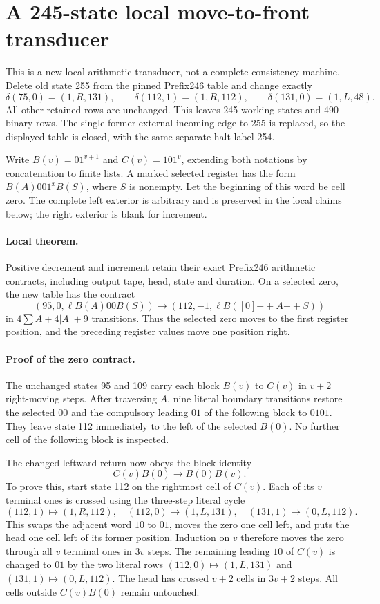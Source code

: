 \section{A 245-state local move-to-front transducer}

This is a new local arithmetic transducer, not a complete consistency machine.
Delete old state 255 from the pinned Prefix246 table and change exactly
\[
\delta(75,0)=(1,R,131),\qquad
\delta(112,1)=(1,R,112),\qquad
\delta(131,0)=(1,L,48).
\]
All other retained rows are unchanged. This leaves 245 working states and
490 binary rows. The single former external incoming edge to 255 is replaced,
so the displayed table is closed, with the same separate halt label 254.

Write $B(v)=01^{v+1}$ and $C(v)=101^v$, extending both notations by
concatenation to finite lists. A marked selected register has the form
$B(A)00 1^x B(S)$, where $S$ is nonempty. Let the beginning of this word be
cell zero. The complete left exterior is arbitrary and is preserved in the
local claims below; the right exterior is blank for increment.

\paragraph{Local theorem.}
Positive decrement and increment retain their exact Prefix246 arithmetic
contracts, including output tape, head, state and duration. On a selected
zero, the new table has the contract
\[
 (95,0,\ell B(A)00B(S))
 \longrightarrow
 (112,-1,\ell B([0]\mathbin{+\!+}A\mathbin{+\!+}S))
\]
in $4\sum A+4|A|+9$ transitions. Thus the selected zero moves to the first
register position, and the preceding register values move one position right.

\paragraph{Proof of the zero contract.}
The unchanged states 95 and 109 carry each block $B(v)$ to $C(v)$ in $v+2$
right-moving steps. After traversing $A$, nine literal boundary transitions
restore the selected $00$ and the compulsory leading $01$ of the following
block to $0101$. They leave state 112 immediately to the left of the selected
$B(0)$. No further cell of the following block is inspected.

The changed leftward return now obeys the block identity
\[
 C(v)B(0)\longrightarrow B(0)B(v).
\]
To prove this, start state 112 on the rightmost cell of $C(v)$. Each of its
$v$ terminal ones is crossed using the three-step literal cycle
\[
 (112,1)\mapsto(1,R,112),\quad
 (112,0)\mapsto(1,L,131),\quad
 (131,1)\mapsto(0,L,112).
\]
This swaps the adjacent word $10$ to $01$, moves the zero one cell left,
and puts the head one cell left of its former position. Induction on $v$
therefore moves the zero through all $v$ terminal ones in $3v$ steps. The
remaining leading $10$ of $C(v)$ is changed to $01$ by the two literal rows
$(112,0)\mapsto(1,L,131)$ and
$(131,1)\mapsto(0,L,112)$. The head has crossed $v+2$ cells in $3v+2$
steps. All cells outside $C(v)B(0)$ remain untouched.

